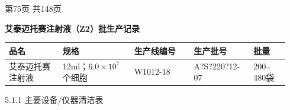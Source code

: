 \documentclass[UTF8,10pt,a4paper,fontset=fandol]{ctexart}
\newcommand{\fieldvalue}[1]{#1}
\newcommand{\handwritten}[1]{#1}
\begin{document}
\bigskip

\begin{center}
第75页 共148页
\end{center}

\newpage

\begin{center}
\textbf{艾泰迈托赛注射液（Z2）批生产记录}
\end{center}

\begin{tabular}{|p{0.18\linewidth}|p{0.24\linewidth}|p{0.20\linewidth}|p{0.20\linewidth}|p{0.12\linewidth}|}
\hline
品名 & 规格 & 生产线编号 & 生产批号 & 批量 \\ \hline
\fieldvalue{艾泰迈托赛注射液} &
\fieldvalue{12ml；$6.0\times 10^{7}$个细胞} &
\fieldvalue{\handwritten{W1012-18}} &
\fieldvalue{\handwritten{A?S?220?12-07}} &
\fieldvalue{200--480袋} \\ \hline
\end{tabular}

\medskip

5.1.1 主要设备/仪器清洁表
\end{document}
